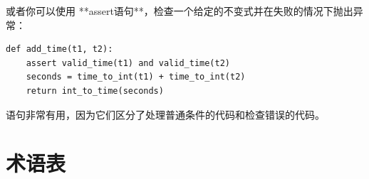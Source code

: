 {%
  

或者你可以使用 **assert语句**，检查一个给定的不变式并在失败的情况下抛出异常：

\begin{lstlisting}
def add_time(t1, t2):
    assert valid_time(t1) and valid_time(t2)
    seconds = time_to_int(t1) + time_to_int(t2)
    return int_to_time(seconds)
\end{lstlisting}

%

 语句非常有用，因为它们区分了处理普通条件的代码和检查错误的代码。

\section{术语表}


}
